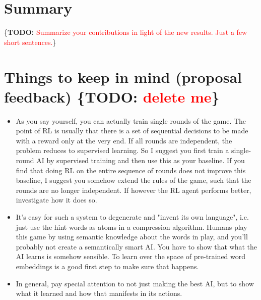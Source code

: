 \documentclass{article}
\newcommand{\TODO}[1]{\{\textbf{TODO: }\textcolor{red}{#1}\}}
\begin{document}
\section{Summary}

\TODO{Summarize your contributions in light of the new results. Just a few short sentences.}







\section{Things to keep in mind (proposal feedback) \TODO{delete me}}

\begin{itemize}
\item As you say yourself, you can actually train single rounds of the game. The point of RL is usually that there is a set of sequential decisions to be made with a reward only at the very end. If all rounds are independent, the problem reduces to supervised learning. So I suggest you first train a single-round AI by supervised training and then use this as your baseline. If you find that doing RL on the entire sequence of rounds does not improve this baseline, I suggest you somehow extend the rules of the game, such that the rounds are no longer independent. If however the RL agent performs better, investigate how it does so.

\item It's easy for such a system to degenerate and "invent its own language", i.e. just use the hint words as atoms in a compression algorithm. Humans play this game by using semantic knowledge about the words in play, and you'll probably not create a semantically smart AI. You have to show that what the AI learns is somehow sensible. To learn over the space of pre-trained word embeddings is a good first step to make sure that happens.

\item In general, pay special attention to not just making the best AI, but to show what it learned and how that manifests in its actions.
\end{itemize}




\end{document}
